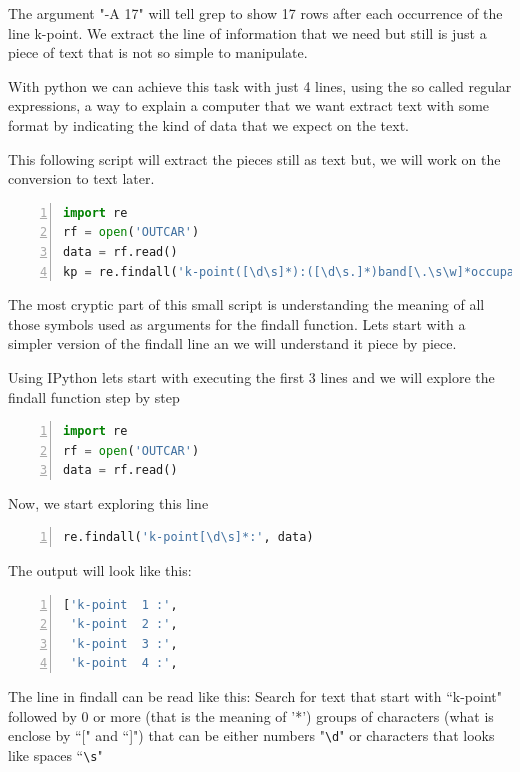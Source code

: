 The argument "-A 17" will tell grep to show 17 rows after each occurrence of the line k-point.
We extract the line of information that we need but still is just a piece of text that is not so simple to manipulate.

With python we can achieve this task with just 4 lines, using the so called regular expressions, a way to explain a computer that we want extract text with some format by indicating the kind of data that we expect on the text.

This following script will extract the pieces still as text but, we will work on the conversion to text later.

\begin{lstlisting}[language=Python, numbers=left]
import re
rf = open('OUTCAR')
data = rf.read()
kp = re.findall('k-point([\d\s]*):([\d\s.]*)band[\.\s\w]*occupation([\s\d:\-\.]*)\n\n', data)
\end{lstlisting}

The most cryptic part of this small script is understanding the meaning of all those symbols used as arguments for the findall function.
Lets start with a simpler version of the findall line an we will understand it piece by piece.

Using IPython lets start with executing the first 3 lines and we will explore the findall function step by step

\begin{lstlisting}[language=Python, numbers=left]
import re
rf = open('OUTCAR')
data = rf.read()
\end{lstlisting}

Now, we start exploring this line

\begin{lstlisting}[language=Python, numbers=left]
re.findall('k-point[\d\s]*:', data)
\end{lstlisting}

The output will look like this:

\begin{lstlisting}[language=Python, numbers=left]
['k-point  1 :',
 'k-point  2 :',
 'k-point  3 :',
 'k-point  4 :',
\end{lstlisting}

The line in findall can be read like this: Search for text that start with ``k-point" followed by 0 or more (that is the meaning of '*') groups of characters (what is enclose by ``[" and ``]") that can be either numbers "\verb|\d|" or characters that looks like spaces ``\verb|\s|"

